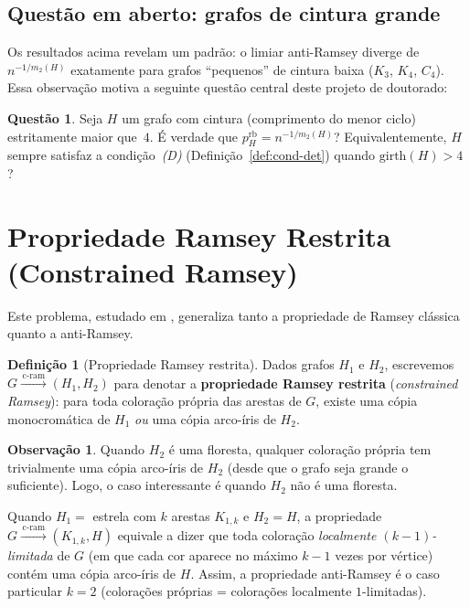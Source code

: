 \documentclass[reqno, 12pt]{amsart}
\numberwithin{equation}{section}
\theoremstyle{plain}
\theoremstyle{definition}
\newtheorem{definition}[theorem]{Definição}
\newtheorem{question}[theorem]{Questão}
\newtheorem{remark}[theorem]{Observação}
\newcommand{\cram}{\xrightarrow{\,\mathrm{c\text{-}ram}\,}}
\newcommand{\mdens}{m_2}
\begin{document}
\subsection{Questão em aberto: grafos de cintura grande}

Os resultados acima revelam um padrão: o limiar anti-Ramsey diverge de
$n^{-1/\mdens(H)}$ exatamente para grafos ``pequenos'' de cintura baixa
($K_3$, $K_4$, $C_4$). Essa observação motiva a seguinte questão central
deste projeto de doutorado:

\begin{question}
    \label{q:cintura}
    Seja $H$ um grafo com cintura (comprimento do menor ciclo) estritamente maior que~$4$.
    É verdade que $p_H^{\mathrm{rb}} = n^{-1/\mdens(H)}$?
    Equivalentemente, $H$ sempre satisfaz a condição~\emph{(D)}
    (Definição~\ref{def:cond-det}) quando $\mathrm{girth}(H) > 4$?
\end{question}

\section{Propriedade Ramsey Restrita (Constrained Ramsey)} \label{sec:cram}

Este problema, estudado em \cite{behague2025thresholds}, generaliza tanto
a propriedade de Ramsey clássica quanto a anti-Ramsey.

\begin{definition}[Propriedade Ramsey restrita]
    \label{def:cram}
    Dados grafos $H_1$ e $H_2$, escrevemos $G \cram (H_1, H_2)$ para denotar
    a \textbf{propriedade Ramsey restrita} (\emph{constrained Ramsey}):
    para toda coloração própria das arestas de $G$,
    existe uma cópia monocromática de $H_1$ \emph{ou} uma cópia arco-íris de $H_2$.
\end{definition}

\begin{remark}
    Quando $H_2$ é uma floresta, qualquer coloração própria tem trivialmente uma
    cópia arco-íris de $H_2$ (desde que o grafo seja grande o suficiente). Logo,
    o caso interessante é quando $H_2$ não é uma floresta.

    Quando $H_1 = $ estrela com $k$ arestas $K_{1,k}$ e $H_2 = H$, a propriedade
    $G \cram (K_{1,k}, H)$ equivale a dizer que toda coloração \emph{localmente
        $(k-1)$-limitada} de $G$ (em que cada cor aparece no máximo $k-1$ vezes por vértice)
    contém uma cópia arco-íris de $H$. Assim,
    a propriedade anti-Ramsey é o caso particular $k = 2$
    (colorações próprias = colorações localmente $1$-limitadas).
\end{remark}
\end{document}
